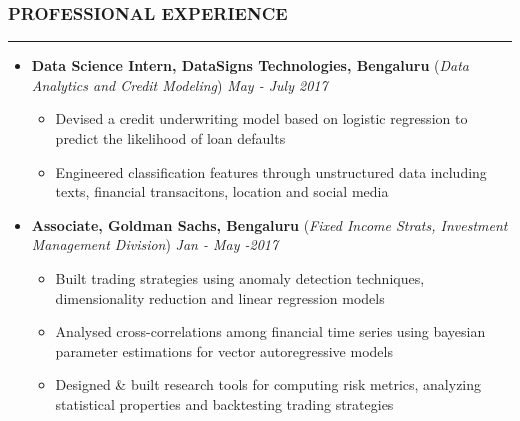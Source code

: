 \documentclass[10pt,a4paper,English]{article}
\newcommand\roottitle[1]{\vspace{-4mm}\subsubsection*{\uppercase{#1}}\vspace{-0.3em}\nopagebreak[4]\hrule\vspace{4mm}}
\newcommand\itemyear[1]{\hfill \emph{\color{itemyear} #1}}
\newcommand\itemenv{\setlength\itemsep{0.5pt} \addtolength{\itemindent}{-5mm}\vspace{-1.5mm}}
\begin{document}
\vspace{1.5mm}

\roottitle{Professional Experience}
\begin{itemize} \itemenv

    \item \textbf{Data Science Intern, DataSigns Technologies, Bengaluru } \hfill({\emph{Data Analytics and Credit Modeling}}) \itemyear{May - July 2017}
        \begin{itemize} \itemenv
            \item Devised a credit underwriting model based on logistic regression to predict the likelihood of loan defaults
            \item Engineered classification features through unstructured data including texts, financial transacitons, location and social media
        \end{itemize}

    \item \textbf{Associate, Goldman Sachs, Bengaluru} \hfill (\emph{Fixed Income Strats, Investment Management Division}) \itemyear{Jan - May -2017}
        \begin{itemize} \itemenv
            \item Built trading strategies using anomaly detection techniques, dimensionality reduction and linear regression models
             \item Analysed cross-correlations among financial time series using bayesian parameter estimations for vector autoregressive models
            \item Designed \& built research tools for computing risk metrics, analyzing statistical properties and backtesting trading strategies
        \end{itemize}


\end{itemize}
\end{document}
